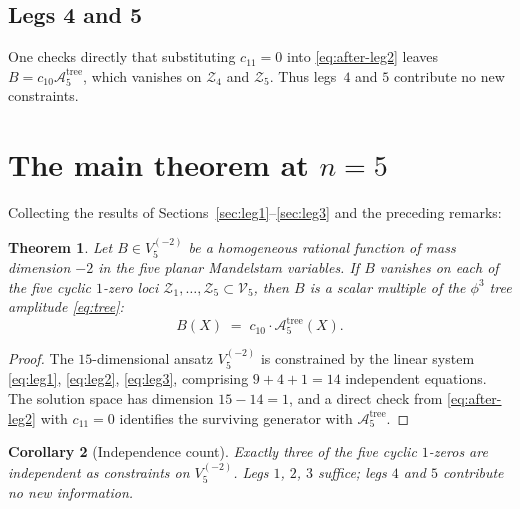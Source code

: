 \documentclass[11pt]{article}
\theoremstyle{plain}
\newtheorem{theorem}{Theorem}[section]
\newtheorem{corollary}[theorem]{Corollary}
\theoremstyle{definition}
\newcommand{\cA}{\mathcal{A}}
\newcommand{\cV}{\mathcal{V}}
\newcommand{\cZ}{\mathcal{Z}}
\begin{document}
\subsection{Legs 4 and 5}

One checks directly that substituting $c_{11} = 0$ into \eqref{eq:after-leg2} leaves
$B = c_{10} \cA_5^{\text{tree}}$, which vanishes on $\cZ_4$ and $\cZ_5$. Thus
legs~$4$ and $5$ contribute no new constraints.

\section{The main theorem at $n=5$}

Collecting the results of Sections~\ref{sec:leg1}--\ref{sec:leg3} and the preceding
remarks:

\begin{theorem}\label{thm:n5}
Let $B \in V_5^{(-2)}$ be a homogeneous rational function of mass dimension $-2$ in
the five planar Mandelstam variables. If $B$ vanishes on each of the five cyclic
$1$-zero loci $\cZ_1, \ldots, \cZ_5 \subset \cV_5$, then $B$ is a scalar multiple of
the $\phi^3$ tree amplitude \eqref{eq:tree}:
\[
B(X) \;=\; c_{10} \cdot \cA_5^{\text{tree}}(X).
\]
\end{theorem}

\begin{proof}
The $15$-dimensional ansatz $V_5^{(-2)}$ is constrained by the linear system
\eqref{eq:leg1}, \eqref{eq:leg2}, \eqref{eq:leg3}, comprising
$9 + 4 + 1 = 14$ independent equations. The solution space has dimension
$15 - 14 = 1$, and a direct check from \eqref{eq:after-leg2} with $c_{11} = 0$
identifies the surviving generator with $\cA_5^{\text{tree}}$.
\end{proof}

\begin{corollary}[Independence count]
Exactly \emph{three} of the five cyclic $1$-zeros are independent as constraints on
$V_5^{(-2)}$. Legs $1$, $2$, $3$ suffice; legs $4$ and $5$ contribute no new
information.
\end{corollary}
\end{document}
